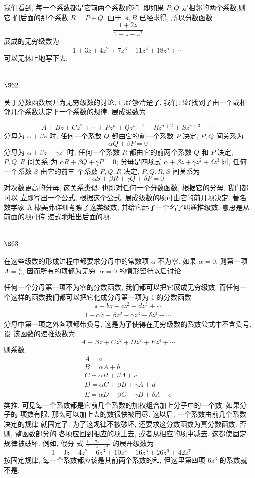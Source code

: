 我们看到, 每一个系数都是它前两个系数的和. 即如果 $P, Q$ 是相邻的两个系数,则它 们后面的那个系数 $R=P+Q$. 由于 $A, B$ 已经求得, 所以分数函数
\[
\frac{1+2 z}{1-z-z^{2}}
\]
展成的无穷级数为
\[
1+3 z+4 z^{2}+7 z^{3}+11 z^{4}+18 z^{5}+\cdots
\]
可以无休止地写下去.

\section{$\S 62$}

关于分数函数展开为无穷级数的讨论, 已经够清楚了. 我们已经找到了由一个或相邻几个系数决定下一个系数的规律. 展成级数为

\[
A+B z+C z^{2}+\cdots+P z^{n}+Q z^{n+1}+R z^{n+2}+S z^{n+3}+\cdots
\]
分母为 $\alpha+\beta z$ 时, 任何一个系数 $Q$ 都由它的前一个系数 $P$ 决定, $P, Q$ 间关系为
\[
\alpha Q+\beta P=0
\]
分母为 $\alpha+\beta z+\gamma z^{2}$ 时, 任何一个系数 $R$ 都由它的前两个系数 $Q$ 和 $P$ 决定, $P, Q, R$ 间关系 为 $\alpha R+\beta Q+\gamma P=0$; 分母是四项式 $\alpha+\beta z+\gamma z^{2}+\delta z^{3}$ 时, 任何一个系数 $S$ 由它的前三 个系数 $P, Q, R$ 决定, $P, Q, R, S$ 间关系为
\[
\alpha S+\beta R+\gamma Q+\delta P=0
\]
对次数更高的分母, 这关系类似. 也即对任何一个分数函数, 根据它的分母, 我们都可以 立即写出一个公式, 根据这个公式, 展成级数的项可由它的前几项决定. 著名数学家 A 棣美弗详细考察了这类级数, 并给它起了一个名字叫递推级数, 意思是从前面的项可传 递式地堆出后面的项.

\section{$\S 63$}

在这些级数的形成过程中都要求分母中的常数项 $\alpha$ 不为零. 如果 $\alpha=0$, 则第一项 $A=\frac{a}{\alpha}$, 因而所有的项都为无穷. $\alpha=0$ 的情形留待以后讨论.

任何一个分母第一项不为零的分数函数, 我们都可以把它展成无穷级数. 而任何一 个这样的函数我们都可以把它化成分母第一项为 1 的分数函数
\[
\frac{a+b z+c z^{2}+d z^{3}+\cdots}{1-\alpha z-\beta z^{2}-\gamma z^{3}-\delta z^{4}-\cdots}
\]
分母中第一项之外各项都带负号, 这是为了使得在无穷级数的系数公式中不含负号. 设 该函数的递推级数为
\[
A+B z+C z^{2}+D z^{3}+E z^{4}+\cdots
\]
则系数
\[
\begin{gathered}
A=a \\
B=\alpha A+b \\
C=\alpha B+\beta A+c \\
D=\alpha C+\beta B+\gamma A+d \\
E=\alpha D+\beta C+\gamma B+\delta A+e
\end{gathered}
\]
类推. 可见每一个系数都是它前几个系数的加权组合加上分子中的一个数. 如果分子的 项数有限, 那么可以加上去的数很快被用尽. 这以后, 一个系数由前几个系数决定的规律 就固定了. 为了这规律不被破坏, 还要求这分数函数为真分数函数. 否则, 整函数部分的 各项应回到相应的项上去, 或者从相应的项中减去. 这都使固定规律被破坏. 例如, 假分 式 $\frac{1+2 z-z^{3}}{1-z-z^{2}}$ 的展开级数为
\[
1+3 z+4 z^{2}+6 z^{3}+10 z^{4}+16 z^{5}+26 z^{6}+42 z^{7}+\cdots
\]
按固定规律, 每一个系数都应该是其前两个系数的和, 但这里第四项 $6 z^{3}$ 的系数就不是.

